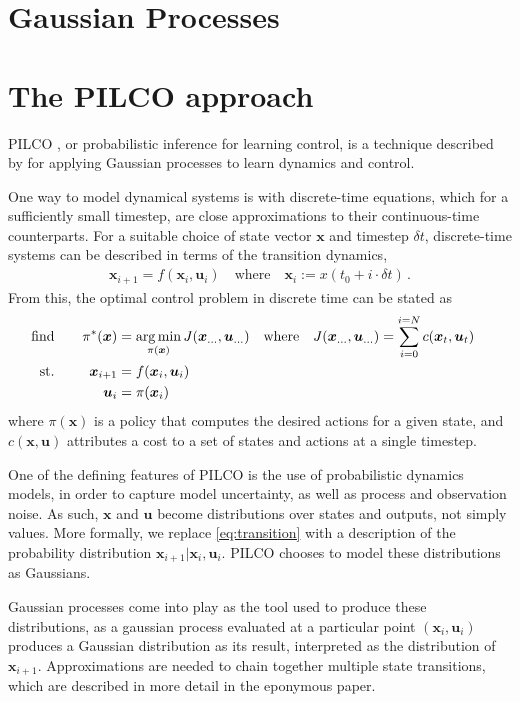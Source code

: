\documentclass[main.tex]{subfiles}
\begin{document}
\section{Gaussian Processes}

\section{The PILCO approach}

	PILCO \cite{pilco}, or probabilistic inference for learning control, is a technique described by \citeauthor{pilco} for applying Gaussian processes to learn dynamics and control.

	One way to model dynamical systems is with discrete-time equations, which for a sufficiently small timestep, are close approximations to their continuous-time counterparts.
	For a suitable choice of state vector $\bm{x}$ and timestep $\delta t$, discrete-time systems can be described in terms of the transition dynamics,
	\begin{align}
		\bm{x}_{i + 1} = f(\bm{x}_{i}, \bm{u}_{i}) \quad \text{where} \quad \bm{x}_{i} := x(t_0 + i\cdot\delta t)\,. \label{eq:transition}
	\end{align}
	From this, the optimal control problem in discrete time can be stated as
	\begin{alignat}{2}
		\text{find}&& \quad
			\pi^*(\bm{x}) &= \operatorname*{arg\,min}_{\pi(\bm{x})}
				J(\bm{x}_{...}, \bm{u}_{...})
				\quad \text{where} \quad
				J(\bm{x}_{...}, \bm{u}_{...}) = \sum_{i=0}^{i=N} c(\bm{x}_t, \bm{u}_t)\quad \\
		\text{st.}&& \quad
			\bm{x}_{i+1} &= f(\bm{x}_{i}, \bm{u}_{i}) \\
		&&
			\bm{u}_i &= \pi(\bm{x}_i)\,
	\end{alignat}
	where $\pi(\bm{x})$ is a policy that computes the desired actions for a given state, and $c(\bm{x}, \bm{u})$ attributes a cost to a set of states and actions at a single timestep.

	One of the defining features of PILCO is the use of probabilistic dynamics models, in order to capture model uncertainty, as well as process and observation noise. As such, $\bm{x}$ and $\bm{u}$ become distributions over states and outputs, not simply values\footnotemark.
	More formally, we replace \cref{eq:transition} with a description of the probability distribution $\bm{x}_{i+1}|\bm{x}_i,\bm{u}_{i}$.
	PILCO chooses to model these distributions as Gaussians.

	Gaussian processes come into play as the tool used to produce these distributions, as a gaussian process evaluated at a particular point $(\bm{x}_i,\bm{u}_i)$ produces a Gaussian distribution as its result, interpreted as the distribution of $\bm{x}_{i+1}$. Approximations are needed to chain together multiple state transitions, which are described in more detail in the eponymous paper\cite{pilco}.
\end{document}
